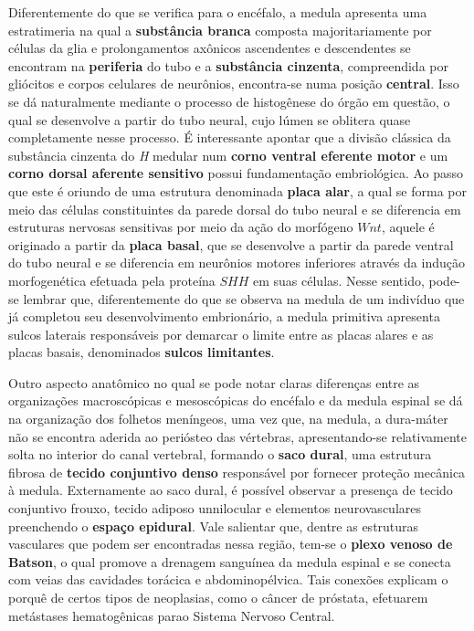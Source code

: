 \documentclass[
]{book}
\theoremstyle{definition}
\theoremstyle{definition}
\theoremstyle{definition}
\theoremstyle{definition}
\theoremstyle{remark}
\begin{document}
Diferentemente do que se verifica para o encéfalo, a medula apresenta uma estratimeria na qual a \textbf{substância branca} composta majoritariamente por células da glia e prolongamentos axônicos ascendentes e descendentes se encontram na \textbf{periferia} do tubo e a \textbf{substância cinzenta}, compreendida por gliócitos e corpos celulares de neurônios, encontra-se numa posição \textbf{central}. Isso se dá naturalmente mediante o processo de histogênese do órgão em questão, o qual se desenvolve a partir do tubo neural, cujo lúmen se oblitera quase completamente nesse processo. É interessante apontar que a divisão clássica da substância cinzenta do \emph{H} medular num \textbf{corno ventral eferente motor} e um \textbf{corno dorsal aferente sensitivo} possui fundamentação embriológica. Ao passo que este é oriundo de uma estrutura denominada \textbf{placa alar}, a qual se forma por meio das células constituintes da parede dorsal do tubo neural e se diferencia em estruturas nervosas sensitivas por meio da ação do morfógeno \(Wnt\), aquele é originado a partir da \textbf{placa basal}, que se desenvolve a partir da parede ventral do tubo neural e se diferencia em neurônios motores inferiores através da indução morfogenética efetuada pela proteína \(SHH\) em suas células. Nesse sentido, pode-se lembrar que, diferentemente do que se observa na medula de um indivíduo que já completou seu desenvolvimento embrionário, a medula primitiva apresenta sulcos laterais responsáveis por demarcar o limite entre as placas alares e as placas basais, denominados \textbf{sulcos limitantes}.

Outro aspecto anatômico no qual se pode notar claras diferenças entre as organizações macroscópicas e mesoscópicas do encéfalo e da medula espinal se dá na organização dos folhetos meníngeos, uma vez que, na medula, a dura-máter não se encontra aderida ao periósteo das vértebras, apresentando-se relativamente solta no interior do canal vertebral, formando o \textbf{saco dural}, uma estrutura fibrosa de \textbf{tecido conjuntivo denso} responsável por fornecer proteção mecânica à medula. Externamente ao saco dural, é possível observar a presença de tecido conjuntivo frouxo, tecido adiposo unnilocular e elementos neurovasculares preenchendo o \textbf{espaço epidural}. Vale salientar que, dentre as estruturas vasculares que podem ser encontradas nessa região, tem-se o \textbf{plexo venoso de Batson}, o qual promove a drenagem sanguínea da medula espinal e se conecta com veias das cavidades torácica e abdominopélvica. Tais conexões explicam o porquê de certos tipos de neoplasias, como o câncer de próstata, efetuarem metástases hematogênicas parao Sistema Nervoso Central.
\end{document}
